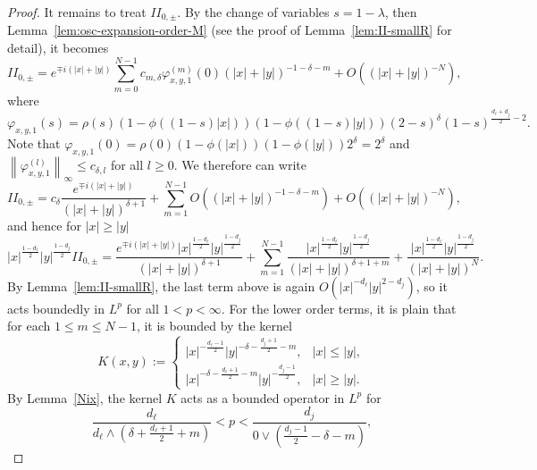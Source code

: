 \documentclass[12pt]{amsart}
\begin{document}
\begin{proof}
It remains to treat $II_{0,\pm}$. By the change of variables $s=1-\lambda$, then Lemma~\ref{lem:osc-expansion-order-M} (see the proof of Lemma~\ref{lem:II-smallR} for detail), it becomes
\begin{equation}\label{II_00}
    II_{0,\pm} = e^{\mp i(|x|+|y|)} \sum_{m=0}^{N-1} c_{m,\delta} \varphi_{x,y,1}^{(m)}(0) \left(|x|+|y|\right)^{-1-\delta-m} + O\left(\left(|x|+|y|\right)^{-N}\right),
\end{equation}
where
\begin{equation*}
    \varphi_{x,y,1}(s)
=
\rho(s) (1-\phi((1-s)|x|))(1-\phi((1-s)|y|))(2-s)^\delta(1-s)^{\frac{d_\ell+d_j}{2}-2}.
\end{equation*}
Note that $\varphi_{x,y,1}(0) = \rho(0) (1-\phi(|x|)) (1-\phi(|y|)) 2^\delta = 2^\delta$ and $\left\| \varphi_{x,y,1}^{(l)}  \right\|_\infty \le c_{\delta,l}$ for all $l\ge 0$. We therefore can write
\begin{equation}
    II_{0,\pm} = c_{\delta} \frac{e^{\mp i(|x|+|y|)}}{(|x|+|y|)^{\delta+1}} + \sum_{m=1}^{N-1} O\left( (|x|+|y|)^{-1-\delta-m} \right)  + O\left(\left(|x|+|y|\right)^{-N}\right),
\end{equation}
and hence for $|x|\ge |y|$
\begin{equation}\label{eq_mainterm}
    |x|^{\frac{1-d_\ell}{2}}|y|^{\frac{1-d_j}{2}} II_{0,\pm} = \frac{e^{\mp i(|x|+|y|)} |x|^{\frac{1-d_\ell}{2}}|y|^{\frac{1-d_j}{2}}}{(|x|+|y|)^{\delta+1}} + \sum_{m=1}^{N-1} \frac{|x|^{\frac{1-d_\ell}{2}}|y|^{\frac{1-d_j}{2}}}{(|x|+|y|)^{\delta+1+m}} + \frac{|x|^{\frac{1-d_\ell}{2}}|y|^{\frac{1-d_j}{2}}}{(|x|+|y|)^N}.
\end{equation}
By Lemma~\ref{lem:II-smallR}, the last term above is again $O\left(|x|^{-d_\ell} |y|^{2-d_j}\right)$, so it acts boundedly in $L^p$ for all $1<p<\infty$. For the lower order terms, it is plain that for each $1\le m\le N-1$, it is bounded by the kernel
\begin{equation*}
    K(x,y):= \begin{cases}
        |x|^{-\frac{d_\ell-1}{2}} |y|^{-\delta-\frac{d_j+1}{2}-m}, & |x|\le |y|,\\
        |x|^{-\delta-\frac{d_\ell+1}{2}-m} |y|^{-\frac{d_j-1}{2}}, & |x|\ge |y|.
    \end{cases}
\end{equation*}
By Lemma~\ref{Nix}, the kernel $K$ acts as a bounded operator in $L^p$ for
\begin{equation}\label{BBR1}
    \frac{d_\ell}{d_\ell \wedge \left( \delta+\frac{d_\ell+1}{2}+m \right)} < p < \frac{d_j}{0 \vee \left( \frac{d_j-1}{2} - \delta-m \right)},

\end{equation}
\end{proof}
\end{document}
